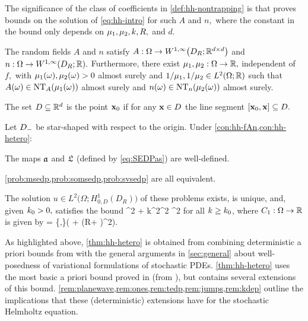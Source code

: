 The significance of the class of coefficients in \cref{def:hh-nontrapping} is that \cite[Theorem 2.5]{GrPeSp:19} proves bounds on the solution of \eqref{eq:hh-intro} for such $A$ and $n,$ where the constant in the bound only depends on $\mu_{1}, \mu_{2}, k, R, $ and $d.$

\label{con:hh-hetero}
The random fields $A$ and $n$ satisfy $A:\Omega\rightarrow\WoiDRRRdtd$ and $n:\Omega\rightarrow \WoiDRRR.$ Furthermore, there exist $\mu_{1}, \mu_{2}:\Omega\rightarrow \mathbb R,$ independent of $f,$ with $\mu_{1}(\omega),\mu_{2}(\omega) > 0$ almost surely and $1/\muo,1/\mut \in \LtORR$  such that $A(\omega) \in \NTA{\muo(\omega)}$ almost surely and $n(\omega) \in \NTn{\mut(\omega)}$ almost surely.
\econ


The set $D \subseteq \mathbb R^{d}$ is  the point $\mathbf{x}_{0}$ if for any $\mathbf{x} \in D$ the line segment $\mleft[\bxz,\bx\mright] \subseteq D.$
\ede

\label{thm:hh-hetero}
Let $D_{-}$ be star-shaped with respect to the origin. Under \cref{con:hh-fAn,con:hh-hetero}:
\bit
\item The maps $\mathfrak{a}$ and $\mathfrak{L}$ (defined by \eqref{eq:SEDPas}) are well-defined.
\item \cref{prob:msedp,prob:somsedp,prob:svsedp} are all equivalent.
\item The solution $u \in %
L^2\big(\Omega;H_{0,D}^1(D_R)\big)$
of these problems exists, is unique, and, given $k_{0} > 0,$ satisfies the bound
\beq\label{eq:Sbound1}
^2 + k^2^2\leq \NLoO{\Co} ^2
\eeq
for all $k\geq k_{0}$, where $C_{1}:\Omega\rightarrow\mathbb R$ is given by
\beq\label{eq:C1}
\Co = \max\mleft\{,\mright\}\mleft( + \mleft(R+ \mright)^2\mright).
\eeq
\eit
\enth

As highlighted above, \cref{thm:hh-hetero} is obtained from combining
deterministic a priori bounds from \cite{GrPeSp:19} with the general
arguments in \cref{sec:general} about well-posedness of variational
formulations of stochastic PDEs. \cref{thm:hh-hetero} uses the most basic a priori bound proved
in \cite{GrPeSp:19} (from \cite[Theorem 2.5]{GrPeSp:19}), but \cite{GrPeSp:19}
contains several extensions of this bound. \cref{rem:planewave,rem:ones,rem:tedp,rem:jumps,rem:kdep}
outline the implications that these (deterministic) extensions have for
the stochastic Helmholtz equation.

